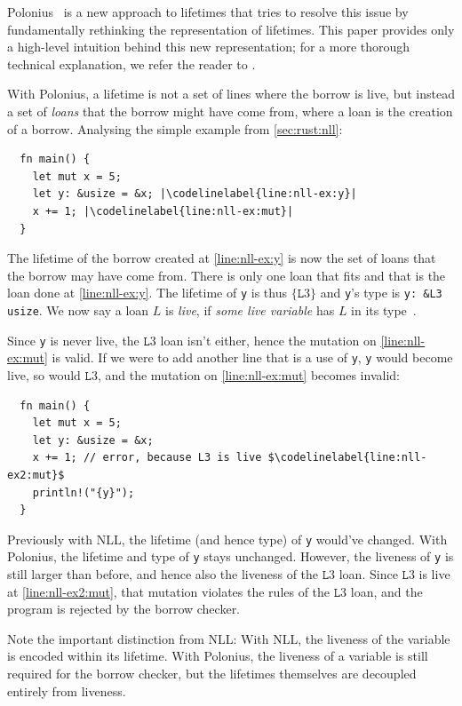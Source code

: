 \documentclass[sigplan,11pt,screen,nonacm]{acmart}
\newcounter{codeline}
\newcommand*{\codelinelabel}[1]{
  \refstepcounter{codeline}
  \setcounter{codeline}{\value{FancyVerbLine}}
  \label[codeline]{#1}
}
\begin{document}
Polonius~\cite{rust:polonius-repo} is a new approach to lifetimes that tries to resolve this issue by fundamentally rethinking the representation of lifetimes. This paper provides only a high-level intuition behind this new representation; for a more thorough technical explanation, we refer the reader to \cite{rust:polonius-book, rust:polonius-talk}.

With Polonius, a lifetime is not a set of lines where the borrow is live, but instead a set of \emph{loans} that the borrow might have come from, where a loan is the creation of a borrow. Analysing the simple example from \cref{sec:rust:nll}:
\begin{verbatim}
  fn main() {
    let mut x = 5;
    let y: &usize = &x; |\codelinelabel{line:nll-ex:y}|
    x += 1; |\codelinelabel{line:nll-ex:mut}|
  }
\end{verbatim}
The lifetime of the borrow created at \cref*{line:nll-ex:y} is now the set of loans that the borrow may have come from. There is only one loan that fits and that is the loan done at \cref*{line:nll-ex:y}. The lifetime of \texttt{y} is thus \(\{\texttt{L}3\}\) and \texttt{y}'s type is \texttt{y: &{L3} usize}. We now say a loan \(L\) is \emph{live}, if \emph{some live variable} has \(L\) in its type~\cite{rust:polonius-talk}.

Since \texttt{y} is never live, the \(\texttt{L}3\) loan isn't either, hence the mutation on \cref*{line:nll-ex:mut} is valid. If we were to add another line that is a use of \texttt{y}, \texttt{y} would become live, so would \(\texttt{L}3\), and the mutation on \cref*{line:nll-ex:mut} becomes invalid:
\begin{verbatim}
  fn main() {
    let mut x = 5;
    let y: &usize = &x;
    x += 1; // error, because L3 is live $\codelinelabel{line:nll-ex2:mut}$
    println!("{y}");
  }
\end{verbatim}
Previously with NLL, the lifetime (and hence type) of \texttt{y} would've changed. With Polonius, the lifetime and type of \texttt{y} stays unchanged. However, the liveness of \texttt{y} is still larger than before, and hence also the liveness of the \(\texttt{L}3\) loan. Since \(\texttt{L}3\) is live at \cref*{line:nll-ex2:mut}, that mutation violates the rules of the \(\texttt{L}3\) loan, and the program is rejected by the borrow checker.

Note the important distinction from NLL: With NLL, the liveness of the variable is encoded within its lifetime. With Polonius, the liveness of a variable is still required for the borrow checker, but the lifetimes themselves are decoupled entirely from liveness.
\end{document}

